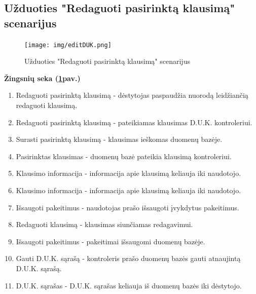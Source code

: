 \documentclass{VUMIFPSkursinis}
\begin{document}
\subsection{Užduoties "Redaguoti pasirinktą klausimą" scenarijus}
\begin{figure}[H]
	\centering
	\texttt{[image: img/editDUK.png]}
	\caption{Užduoties "Redaguoti pasirinktą klausimą" scenarijus}
	\label{fig:editDuk}
\end{figure}
\textbf{Žingsnių seka (\ref{fig:editDuk}pav.)}\\
\begin{enumerate}
	\item Redaguoti pasirinktą klausimą - dėstytojas paspaudžia nuorodą leidžiančią redaguoti klausimą.
	\item Redaguoti pasirinktą klausimą - pateikiamas klausimas D.U.K. kontroleriui.
	\item Surasti pasirinktą klausimą - klausimas ieškomas duomenų bazėje.
	\item Pasirinktas klausimas - duomenų bazė pateikia klausimą kontroleriui.
	\item Klausimo informacija -  informacija apie klausimą keliauja iki naudotojo.
	\item Klausimo informacija - informacija apie klausimą keliauja iki naudotojo.
	\item Išsaugoti pakeitimus - naudotojas prašo išsaugoti įvykdytus pakeitimus.
	\item Redaguoti klausimą - klausimas siunčiamas redagavimui.
	\item Išsaugoti pakeitimus - pakeitimai išsaugomi duomenų bazėje.
	\item Gauti D.U.K. sąrašą - kontroleris prašo duomenų bazės gauti atnaujintą D.U.K. sąrašą.
	\item D.U.K. sąrašas - D.U.K. sąrašas keliauja iš duomenų bazės iki dėstytojo.
\end{enumerate}
\end{document}
